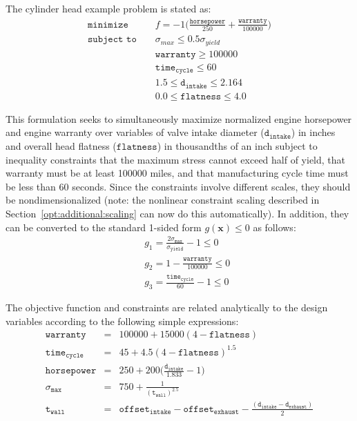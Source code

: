 The cylinder head example problem is stated as:
\begin{eqnarray}
\texttt{minimize }   & & f=-1\bigg(\frac{\mathtt{horsepower}}{250}+
  \frac{\mathtt{warranty}}{100000}\bigg) \nonumber\\
\texttt{subject to } & & \sigma_{max} \leq 0.5 \sigma_{yield}
  \label{additional:cylhead}\\
                     & & \mathtt{warranty} \geq 100000          \nonumber\\
                     & & \mathtt{time_{cycle}} \leq 60          \nonumber\\
                     & & 1.5 \leq \mathtt{d_{intake}} \leq 2.164\nonumber\\
                     & & 0.0 \leq \mathtt{flatness} \leq 4.0    \nonumber
\end{eqnarray}

This formulation seeks to simultaneously maximize normalized engine
horsepower and engine warranty over variables of valve intake diameter
($\mathtt{d_{intake}}$) in inches and overall head flatness
($\mathtt{flatness}$) in thousandths of an inch subject to inequality
constraints that the maximum stress cannot exceed half of yield, that
warranty must be at least 100000 miles, and that manufacturing cycle
time must be less than 60 seconds. Since the constraints involve
different scales, they should be nondimensionalized (note: the
nonlinear constraint scaling described in
Section~\ref{opt:additional:scaling} can now do this
automatically). In addition, they can be converted to the standard
1-sided form $g(\mathbf{x}) \leq 0$ as follows:
\begin{eqnarray}
  & & g_1=\frac{2\sigma_{\mathtt{max}}}{\sigma_{\mathtt{yield}}}-1 \leq 0
  \nonumber\\
  & & g_2=1-\frac{\mathtt{warranty}}{100000} \leq 0
  \label{additional:cylheadaltg}\\
  & & g_3=\frac{\mathtt{time_{cycle}}}{60}-1 \leq 0\nonumber
\end{eqnarray}

The objective function and constraints are related analytically to the
design variables according to the following simple expressions:
\begin{eqnarray}
\mathtt{warranty}     &=& 100000+15000(4-\mathtt{flatness})\nonumber\\
\mathtt{time_{cycle}} &=& 45+4.5(4-\mathtt{flatness})^{1.5}\nonumber\\
\mathtt{horsepower}   &=& 250+200\bigg(\frac{\mathtt{d_{intake}}}{1.833}-1\bigg)
  \label{additional:cylheadexp}\\
\sigma_{\mathtt{max}} &=& 750+\frac{1}{(\mathtt{t_{wall}})^{2.5}}\nonumber\\
\mathtt{t_{wall}}     &=& \mathtt{offset_{intake}-offset_{exhaust}}-
  \frac{(\mathtt{d_{intake}-d_{exhaust}})}{2}\nonumber
\end{eqnarray}

